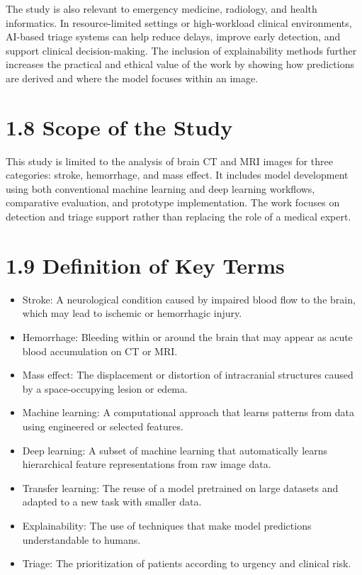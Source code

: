 \documentclass[12pt,a4paper]{report}
\begin{document}
The study is also relevant to emergency medicine, radiology, and health informatics. In resource-limited settings or high-workload clinical environments, AI-based triage systems can help reduce delays, improve early detection, and support clinical decision-making. The inclusion of explainability methods further increases the practical and ethical value of the work by showing how predictions are derived and where the model focuses within an image.

\section{1.8 Scope of the Study}

This study is limited to the analysis of brain CT and MRI images for three categories: stroke, hemorrhage, and mass effect. It includes model development using both conventional machine learning and deep learning workflows, comparative evaluation, and prototype implementation. The work focuses on detection and triage support rather than replacing the role of a medical expert.

\section{1.9 Definition of Key Terms}

\begin{itemize}
\item Stroke: A neurological condition caused by impaired blood flow to the brain, which may lead to ischemic or hemorrhagic injury.
\item Hemorrhage: Bleeding within or around the brain that may appear as acute blood accumulation on CT or MRI.
\item Mass effect: The displacement or distortion of intracranial structures caused by a space-occupying lesion or edema.
\item Machine learning: A computational approach that learns patterns from data using engineered or selected features.
\item Deep learning: A subset of machine learning that automatically learns hierarchical feature representations from raw image data.
\item Transfer learning: The reuse of a model pretrained on large datasets and adapted to a new task with smaller data.
\item Explainability: The use of techniques that make model predictions understandable to humans.
\item Triage: The prioritization of patients according to urgency and clinical risk.
\end{itemize}
\end{document}

